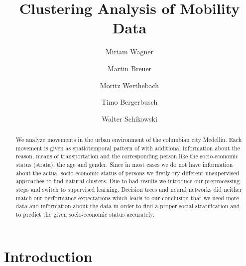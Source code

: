 \documentclass[runningheads]{llncs}
\begin{document}
	\title{Clustering Analysis of Mobility Data}
	\author{Miriam Wagner\and
		Martin Breuer\and
		Moritz Werthebach\and
		Timo Bergerbusch\and
		Walter Schikowski}
	\maketitle              %
	\begin{abstract} %
		We analyze movements in the urban environment of the columbian city Medellín. Each movement is given as spatiotemporal pattern of with additional information about the reason, means of transportation and the corresponding person like the socio-economic status (strata), the age and gender. Since in most cases we do not have information about the actual socio-economic status of persons we firstly try different unsupervised approaches to find natural clusters. Due to bad results we introduce our preprocessing steps and switch to supervised learning. Decision trees and neural networks did neither match our performance expectations which leads to our conclusion that we need more data and information about the data in order to find a proper social stratification and to predict the given socio-economic status accurately.
		
	\end{abstract}
	\section{Introduction}
\end{document}

